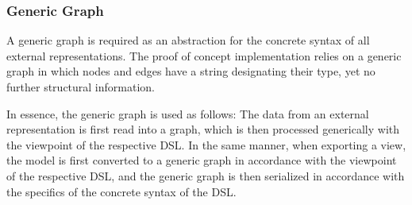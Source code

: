 
\subsubsection{Generic Graph}

A generic graph is required as an abstraction for the concrete syntax of all external representations. The proof of concept implementation relies on a generic graph in which nodes and edges have a string designating their type, yet no further structural information.

In essence, the generic graph is used as follows: The data from an external representation is first read into a graph, which is then processed generically with the viewpoint of the respective DSL. In the same manner, when exporting a view, the model is first converted to a generic graph in accordance with the viewpoint of the respective DSL, and the generic graph is then serialized in accordance with the specifics of the concrete syntax of the DSL.

